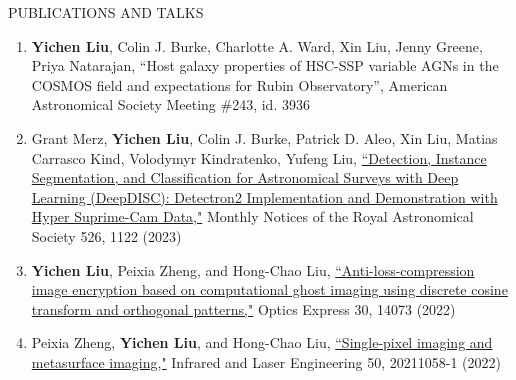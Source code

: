 \documentclass[10pt]{article} %
\begin{document}
\begin{section}{PUBLICATIONS AND TALKS}
    
\begin{enumerate}[leftmargin=1.5em]
    \item \textbf{Yichen Liu}, Colin J. Burke, Charlotte A. Ward, Xin Liu, Jenny Greene, Priya Natarajan, ``Host galaxy properties of HSC-SSP variable AGNs in the COSMOS field and expectations for Rubin Observatory'', American Astronomical Society Meeting \#243, id. 3936
    \item Grant Merz, \textbf{Yichen Liu}, Colin J. Burke, Patrick D. Aleo, Xin Liu, Matias Carrasco Kind, Volodymyr Kindratenko, Yufeng Liu, \href{https://academic.oup.com/mnras/advance-article-abstract/doi/10.1093/mnras/stad2785/7273850?redirectedFrom=fulltext}{``Detection, Instance Segmentation, and Classification for Astronomical Surveys with Deep Learning (DeepDISC): Detectron2 Implementation and Demonstration with Hyper Suprime-Cam Data,"} Monthly Notices of the Royal Astronomical Society 526, 1122 (2023)
    \item \textbf{Yichen Liu}, Peixia Zheng, and Hong-Chao Liu, \href{https://opg.optica.org/oe/fulltext.cfm?uri=oe-30-9-14073&id=471300}{``Anti-loss-compression image encryption based on computational ghost imaging using discrete cosine transform and orthogonal patterns,"} Optics Express 30, 14073 (2022)
    \item Peixia Zheng, \textbf{Yichen Liu}, and Hong-Chao Liu, \href{http://www.irla.cn/cn/article/doi/10.3788/IRLA20211058}{``Single-pixel imaging and metasurface imaging,"} Infrared and Laser Engineering 50, 20211058-1 (2022)
\end{enumerate}

\end{section}
\end{document}
